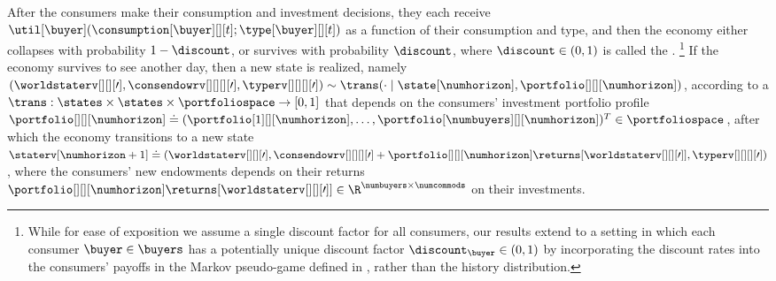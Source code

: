 After the consumers make their consumption and investment decisions, they each receive  $\util[\buyer] (\consumption[\buyer][][t]; \type[\buyer][][t])$ as a function of their consumption and type, and then
the economy either collapses with probability $1 - \discount$, or survives with probability $\discount$, where $\discount \in (0, 1)$ is called the .
\footnote{While for ease of exposition we assume a single discount factor for all consumers, our results extend to a setting in which each consumer $\buyer \in \buyers$ has a potentially unique discount factor $\discount_\buyer \in (0, 1)$ by incorporating the discount rates into the consumers' payoffs in the Markov pseudo-game defined in , rather than the history distribution.} 
If the economy survives to see another day, then a new state is realized, namely 
$(\worldstaterv[][][\prime], \consendowrv[][][][\prime], \typerv[][][][\prime]) \sim \trans(\cdot \mid \state[\numhorizon], \portfolio[][][\numhorizon])$, according to a  
$\trans: \states \times \states \times \portfoliospace \to [0, 1]$ that depends on the consumers' 
investment portfolio profile $\portfolio[][][\numhorizon] \doteq (\portfolio[1][][\numhorizon], \hdots, \portfolio[\numbuyers][][\numhorizon])^T \in \portfoliospace$, after which the economy transitions to a new state $\staterv[\numhorizon + 1] \doteq (\worldstaterv[][][\prime], \consendowrv[][][][\prime] + \portfolio[][][\numhorizon] \returns[{\worldstaterv[][][\prime]}], \typerv[][][][\prime])$, where the consumers' new endowments depends on their returns $\portfolio[][][\numhorizon] \returns[{\worldstaterv[][][\prime]}] \in \R^{\numbuyers \times \numcommods}$ on their investments.



